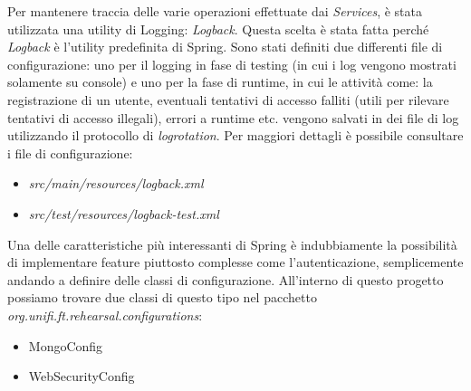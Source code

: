 Per mantenere traccia delle varie operazioni effettuate dai \textsl{Services}, è stata utilizzata una utility di Logging: \textsl{Logback}. Questa scelta è stata fatta perché \textsl{Logback} è l'utility predefinita di Spring.\newline
Sono stati definiti due differenti file di configurazione: uno per il logging in fase di testing (in cui i log vengono mostrati solamente su console) e uno per la fase di runtime, in cui le attività come: la registrazione di un utente, eventuali tentativi di accesso falliti (utili per rilevare tentativi di accesso illegali), errori a runtime etc. vengono salvati in dei file di log utilizzando il protocollo di \textsl{logrotation}.\newline
Per maggiori dettagli è possibile consultare i file di configurazione:
\begin{itemize}
	\item \textsl{src/main/resources/logback.xml}
	\item \textsl{src/test/resources/logback-test.xml}
\end{itemize}

Una delle caratteristiche più interessanti di Spring è indubbiamente la possibilità di implementare feature piuttosto complesse come l'autenticazione, semplicemente andando a definire delle classi di configurazione.\newline
All'interno di questo progetto possiamo trovare due classi di questo tipo nel pacchetto \textsl{org.unifi.ft.rehearsal.configurations}:
\begin{itemize}
	\item MongoConfig
	\item WebSecurityConfig
\end{itemize}

